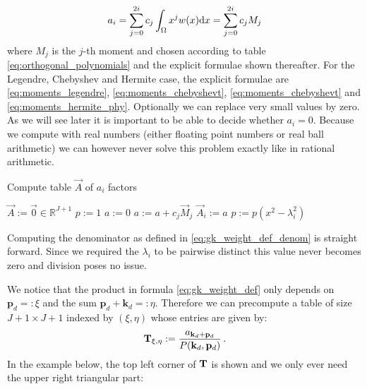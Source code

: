 \documentclass[a4paper,10pt]{article}
\begin{document}
\begin{equation}
  a_i = \sum_{j=0}^{2i} c_j \int_\Omega x^j w(x) \mathrm{d}x = \sum_{j=0}^{2i} c_j M_j
\end{equation}
where $M_j$ is the $j$-th moment and chosen according to table
\eqref{eq:orthogonal_polynomials} and the explicit formulae shown thereafter.
For the Legendre, Chebyshev and Hermite case, the explicit formulae are
\eqref{eq:moments_legendre}, \eqref{eq:moments_chebyshevt}, \eqref{eq:moments_chebyshevt}
and \eqref{eq:moments_hermite_phy}.
Optionally we can replace very small values by zero. As we will see later
it is important to be able to decide whether $a_{i} = 0$. Because we
compute with real numbers (either floating point numbers or real ball arithmetic)
we can however never solve this problem exactly like in rational arithmetic.

\begin{algorithm}[h!]
  \caption{Compute table $\vec{A}$ of $a_{i}$ factors}
  \label{alg:gk_compute_a_values}
  \begin{algorithmic}
      \State $\vec{A} := \vec{0} \in \mathbb{R}^{J+1}$
      \State $p := 1$
        \State $a := 0$
          \State $a := a + c_j \vec{M}_j$
        \EndFor
        \State $\vec{A}_i := a$
        \State $p := p \left(x^2 - \lambda_i^2\right)$
      \EndFor
    \EndProcedure
  \end{algorithmic}
\end{algorithm}

Computing the denominator as defined in \eqref{eq:gk_weight_def_denom}
is straight forward. Since we required the $\lambda_i$ to be pairwise
distinct this value never becomes zero and division poses no issue.

We notice that the product in formula \eqref{eq:gk_weight_def} only depends on
$\mathbf{p}_{d} =: \xi$ and the sum $\mathbf{p}_{d}+\mathbf{k}_{d} =: \eta$.
Therefore we can precompute a table of size $J+1 \times J+1$ indexed by $(\xi, \eta)$
whose entries are given by:
\begin{equation}
  \mathbf{T}_{\xi, \eta} := \frac{a_{\mathbf{k}_{d}+\mathbf{p}_{d}}}{P(\mathbf{k}_{d},\mathbf{p}_{d})} \,.
\end{equation}
In the example below, the top left corner of $\mathbf{T}$ is shown and we only
ever need the upper right triangular part:
\end{document}
